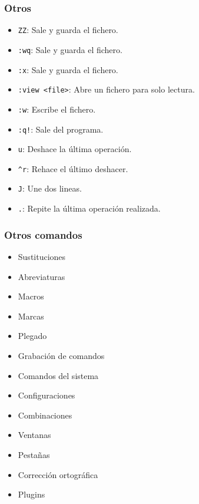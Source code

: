 \documentclass[10pt]{beamer}
\begin{document}
  \begin{frame}[containsverbatim]
    \frametitle{Otros}
    \begin{itemize}
      \item \verb+ZZ+: Sale y guarda el fichero.
      \item \verb+:wq+: Sale y guarda el fichero.
      \item \verb+:x+: Sale y guarda el fichero.
      \item \verb+:view <file>+: Abre un fichero para solo lectura.
      \item \verb+:w+: Escribe el fichero.
      \item \verb+:q!+: Sale del programa.
      \item \verb+u+: Deshace la última operación.
      \item \verb+^r+: Rehace el último deshacer.
      \item \verb+J+: Une dos lineas.
      \item \verb+.+: Repite la última operación realizada.
    \end{itemize}
  \end{frame}

  
  \begin{frame}
    \frametitle{Otros comandos}
    \begin{itemize}
      \item Sustituciones
      \item Abreviaturas
      \item Macros
      \item Marcas
      \item Plegado
      \item Grabación de comandos
      \item Comandos del sistema
      \item Configuraciones
      \item Combinaciones
      \item Ventanas
      \item Pestañas
      \item Corrección ortográfica
      \item Plugins
    \end{itemize}
  \end{frame}
  
\end{document}
